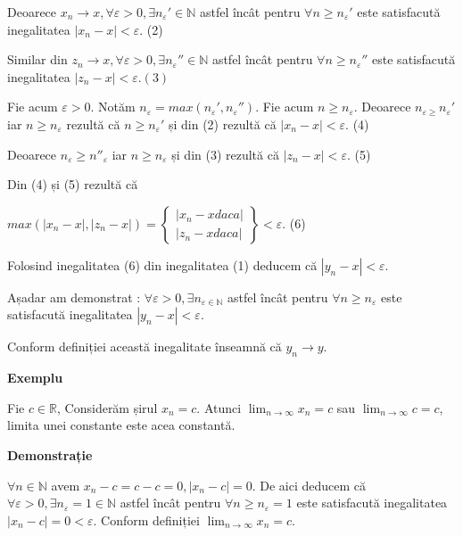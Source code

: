 \documentclass[a4paper,12pt,oneside]{report}
\begin{document}
Deoarece \(x_{n} \to x, \forall \varepsilon > 0, \exists {n_{\varepsilon }}'\in \mathbb{N}\) astfel încât pentru \(\forall n \geq {n_{\varepsilon }}'\) este satisfacută inegalitatea \(\left | x_{n}-x \right |< \varepsilon.\) (2)
	
Similar din \(z_{n} \to x, \forall \varepsilon > 0,\exists {n_{\varepsilon }}'' \in \mathbb{N}\) astfel încât pentru \(\forall n\geq {n_{\varepsilon }}''\) este satisfacută inegalitatea \(\left | z_{n} -x \right |< \varepsilon. (3)\)

Fie acum \(\varepsilon > 0.\) Notăm \(n_{\varepsilon } = max ({n_{\varepsilon }}', {n_{\varepsilon }}'')\). Fie acum \(n\geq n_{\varepsilon }\). Deoarece \(n_{\varepsilon \geq }{n_{\varepsilon }}'\) iar \(n\geq n_{\varepsilon }\) rezultă că \(n\geq {n_{\varepsilon }}'\) și din (2) rezultă că \(\left | x_{n} - x \right |< \varepsilon\). (4) 
	
Deoarece \(n_{\varepsilon }\geq {n}''_{\varepsilon }\) iar \(n\geq n_{\varepsilon}\) și din (3) rezultă că  \(\left | z_{n}-x  \right |< \varepsilon\). (5)
	
Din (4) și (5) rezultă că

\( max(\left | x_{n} -x  \right |, \left | z_{n}-x \right |) = \begin{Bmatrix}
\left | x_{n}-x daca  \right |\\ 
\left | z_{n}-x daca  \right |
\end{Bmatrix} < \varepsilon. \) (6)

Folosind inegalitatea (6) din inegalitatea (1) deducem că \(\left | y_{n}-x  \right |< \varepsilon\).
 
Așadar am demonstrat : \(\forall \varepsilon > 0, \exists n_{\varepsilon \in \mathbb{N}}\) astfel încât pentru \(\forall n\geq n_{\varepsilon }\) este satisfacută inegalitatea \(\left | y_{n}-x \right |< \varepsilon.\) 

Conform definiției această inegalitate înseamnă că \(y_{n} \to y.\) 

\textbf{Exemplu}

Fie \(c \in \mathbb{R}\), Considerăm șirul \(x_{n}=c\). Atunci \(\lim_{n \to \infty }x_{n}=c\) sau \(\lim_{n \to \infty }c=c\), limita unei constante este acea constantă. 

\textbf{Demonstrație}

\(\forall n\in \mathbb{N}\) avem \(x_{n} - c = c - c = 0 , \left | x_{n}-c \right |= 0\). De aici deducem că \(\forall \varepsilon > 0, \exists n_{\varepsilon} = 1 \in \mathbb{N}\) astfel încât pentru \(\forall n\geq n_{\varepsilon }= 1\) este satisfacută inegalitatea \(\left | x_{n}-c \right |= 0< \varepsilon\). 
	Conform definiției \(\lim_{n \to \infty }x_{n} = c. \)
	
\end{document}
